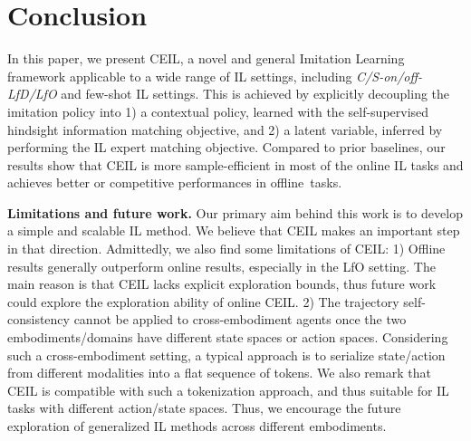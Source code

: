 \vspace{-2pt}
\section{Conclusion}
\vspace{-3pt}

In this paper, we present CEIL, a novel and general Imitation Learning framework applicable to a wide range of IL settings, including \textit{C/S-on/off-LfD/LfO} and few-shot IL settings. 
This is achieved by explicitly decoupling the imitation policy into 1) a contextual policy, learned with the self-supervised hindsight information matching objective, and 2) a latent variable, inferred by performing the IL expert matching objective. 
Compared to prior baselines, our results show that CEIL is more sample-efficient in most of the online IL tasks and achieves better or competitive performances in offline~tasks.  





\textbf{Limitations and future work.} 
Our primary aim behind this work is to develop a simple and scalable IL method. We believe that CEIL makes an important step in that direction. Admittedly, we also find some limitations of CEIL: 1) Offline results generally outperform online results, especially in the LfO setting. The main reason is that CEIL lacks explicit exploration bounds, thus future work could explore the exploration ability of online CEIL. 
2) The trajectory self-consistency cannot be applied to cross-embodiment agents once the two embodiments/domains have different state spaces or action spaces. 
Considering such a cross-embodiment setting, a typical approach is to serialize state/action from different modalities into a flat sequence of tokens. We also remark that CEIL is compatible with such a tokenization approach, and thus suitable for IL tasks with different action/state spaces. %
Thus, we encourage the future exploration of generalized IL methods across different embodiments.








